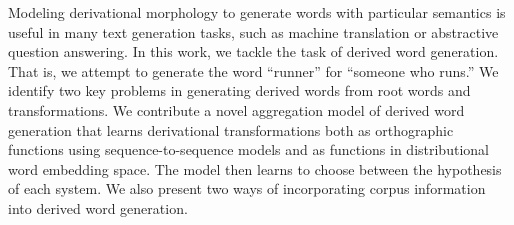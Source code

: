 Modeling derivational morphology to generate words with particular semantics is useful in many text generation tasks, such as machine translation or abstractive question answering. In this work, we tackle the task of derived word generation. That is, we attempt to generate the word ``runner'' for ``someone who runs.'' We identify two key problems in generating derived words from root words and transformations. We contribute a novel aggregation model of derived word generation that learns derivational transformations both as orthographic functions using sequence-to-sequence models and as functions in distributional word embedding space. The model then learns to choose between the hypothesis of each system. We also present two ways of incorporating corpus information into derived word generation.
